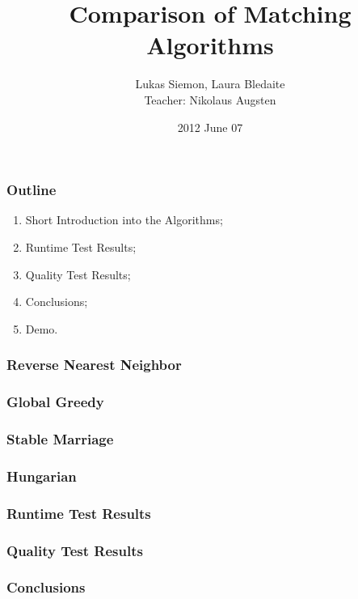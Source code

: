 \documentclass[12pt,a4paper]{beamer}
\title[Comparison of Matching Algorithms]{Comparison of Matching Algorithms}
\author[L. Siemon, L. Bledaite]{
     Lukas Siemon, Laura Bledaite\\
     {\small Teacher: Nikolaus Augsten}
     }
\institute[Free University of Bozen - Bolzano] {
    Free University of Bozen - Bolzano\\
    Faculty of Computer Science
}
\date{2012 June 07}
\begin{document}
\begin{frame}
	\titlepage
\end{frame}



\begin{frame}
	\frametitle{Outline} 
	\begin{enumerate} 	
		\item Short Introduction into the Algorithms;
		\item Runtime Test Results;
		\item Quality Test Results;
		\item Conclusions;
		\item Demo.
	\end{enumerate}

\end{frame}

\begin{frame}
	\frametitle{Reverse Nearest Neighbor} 
\end{frame}

\begin{frame}
	\frametitle{Global Greedy} 
\end{frame}

\begin{frame}
	\frametitle{Stable Marriage} 
\end{frame}

\begin{frame}
	\frametitle{Hungarian} 
\end{frame}

\begin{frame}
	\frametitle{Runtime Test Results} 
\end{frame}

\begin{frame}
	\frametitle{Quality Test Results} 
\end{frame}

\begin{frame}
	\frametitle{Conclusions} 
\end{frame}
\end{document}
